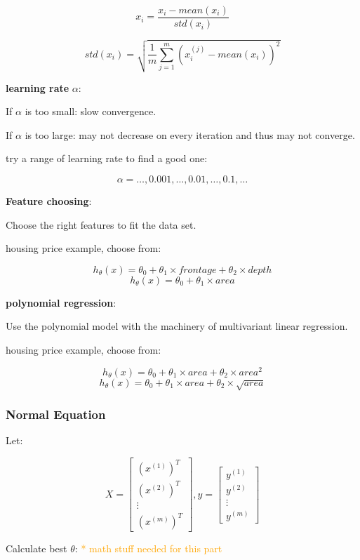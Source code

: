 \documentclass{article}
\begin{document}
\[x_i = \frac{x_i - mean(x_i)}{std(x_i)}\]

\[std(x_i) = \sqrt{\frac{1}{m} \sum_{j = 1}^m (x^{(j)}_i - mean(x_i))^2}\]

\noindent \textbf{learning rate} \(\alpha\):

\noindent If \(\alpha\) is too small: slow convergence.

\noindent If \(\alpha\) is too large: may not decrease on every iteration and thus may not converge.

\noindent try a range of learning rate to find a good one:

\[\alpha = \dots, 0.001, \dots, 0.01, \dots, 0.1, \dots\]

\noindent \textbf{Feature choosing}:

\noindent Choose the right features to fit the data set.

\noindent housing price example, choose from:

\[h_{\theta}(x) = \theta_0 + \theta_1 \times frontage + \theta_2 \times depth\]
\[h_{\theta}(x) = \theta_0 + \theta_1 \times area\]

\noindent \textbf{polynomial regression}:

\noindent Use the polynomial model with the machinery of multivariant linear regression.

\noindent housing price example, choose from:

\[h_{\theta}(x) = \theta_0 + \theta_1 \times area + \theta_2 \times area^2\]
\[h_{\theta}(x) = \theta_0 + \theta_1 \times area + \theta_2 \times \sqrt{area}\]

\subsubsection{Normal Equation}

\noindent Let:

\[
X = 
\begin{bmatrix}
(x^{(1)})^T\\
(x^{(2)})^T\\
\vdots\\
(x^{(m)})^T
\end{bmatrix}
,
y = 
\begin{bmatrix}
y^{(1)}\\
y^{(2)}\\
\vdots\\
y^{(m)}
\end{bmatrix}
\]

\noindent Calculate best \(\theta\): \textcolor{orange}{ * math stuff needed for this part}
\end{document}
